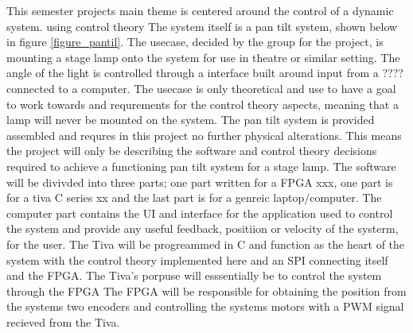 \documentclass[../../main]{subfiles}
\begin{document}
This semester projects main theme is centered around the control of a dynamic system. using control theory The system itself is a pan tilt system, shown below in figure \ref{figure_pantil}. The usecase, decided by the group for the project, is mounting a stage lamp onto the system for use in theatre or similar setting. The angle of the light is controlled through a interface built around input from a ???? connected to a computer. The usecase is only theoretical and use to have a goal to work towards and requrements for the control theory aspects, meaning that a lamp will never be mounted on the system. The pan tilt system is provided assembled and requres in this project no further physical alterations. This means the project will only be describing the software and control theory decisions required to achieve a functioning pan tilt system for a stage lamp. The software will be divivded into three parts; one part written for a  FPGA xxx, one part is for a tiva C series xx and the last part is for a genreic laptop/computer. The computer part contains the UI and interface for the application used to control the system and provide any useful feedback, positiion or velocity of the systerm, for the user. The Tiva will be progreammed in C and function as the heart of the system with the control theory implemented here and an SPI connecting  itself and the FPGA. The Tiva's porpuse will esssentially be to control the system through the FPGA The FPGA will be responsible for obtaining the position from the systems two encoders and controlling the systems motors with a PWM signal recieved from the Tiva. 
\end{document}

